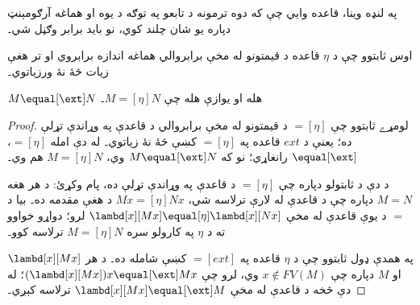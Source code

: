 \documentclass[../../../include/open-logic-section]{subfiles}
\begin{document}
په لنډه وينا، قاعده وايي چې که دوه ترمونه د تابعو په توګه د يوه او
هماغه آرګومېنټ دپاره يو شان چلند کوي، نو بايد برابر وګڼل شي۔

اوس ثابتوو چې د $\eta$ قاعده د قيمتونو له مخې برابروالي هماغه
اندازه برابروي او تر هغې زيات څۀ نۀ ورزياتوي۔

\begin{thm}
  $M \equal[\ext] N$ هله او يوازې هله چې $M \equal[\eta] N$۔
\end{thm}

\begin{proof}
  لومړے ثابتوو چې $\equal[\eta]$ د قيمتونو له مخې برابروالي د
  قاعدې په وړاندې تړلې ده؛ يعنې د $ext$ قاعده په $\equal[\eta]$
  کښې څۀ نۀ زياتوي۔ له دې امله $\equal[\eta]$، $\equal[\ext]$
  رانغاړي؛ نو که $M \equal[\ext] N$ وي، $M \equal[\eta] N$ هم وي۔

  د دې د ثابتولو دپاره چې $\equal[\eta]$ د \ext{} قاعدې په وړاندې
  تړلې ده، پام وکړئ: د هر هغه $M \equal N$ دپاره چې د \ext{} قاعدې
  له لارې ترلاسه شي، $Mx \equal[\eta] Nx$ د هغې مقدمه ده۔ بيا د
  $\equal$ د يوې قاعدې له مخې $\lambd[x][Mx] \equal[\eta]
  \lambd[x][Nx]$ لرو؛ دواړو خواوو ته د $\eta$ په کارولو سره
  $M \equal[\eta] N$ ترلاسه کوو۔

  په همدې ډول ثابتوو چې د $\eta$ قاعده په $\equal[ext]$ کښې
  شامله ده۔ د هر $\lambd[x][Mx]$ او $M$ دپاره چې $x \notin
  FV(M)$ وي، لرو چې $(\lambd[x][Mx])x \equal[\ext] Mx$؛
  له دې څخه د \ext{} قاعدې له مخې $\lambd[x][Mx] \equal[\ext] M$
  ترلاسه کېږي۔
\end{proof}
\end{document}
